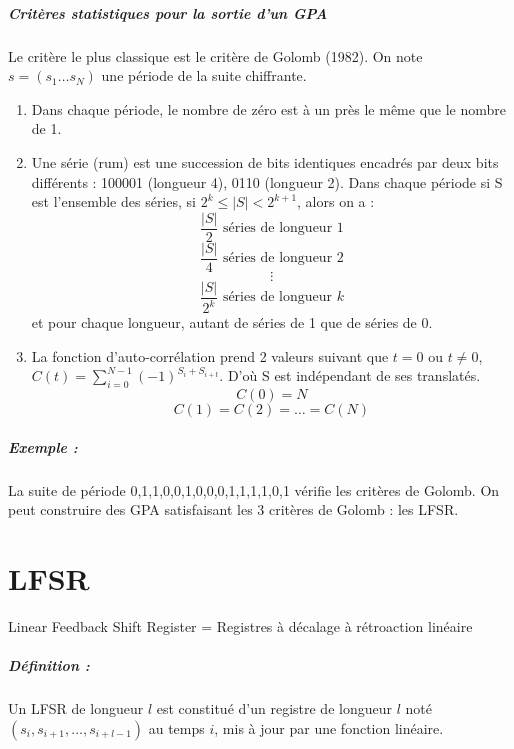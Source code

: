 \documentclass[12pt,a4paper]{report}
\begin{document}
\paragraph{Critères statistiques pour la sortie d'un GPA \\}
Le critère le plus classique est le critère de Golomb (1982). On note $s=(s_1\ldots s_N)$ une période de la suite chiffrante.
\begin{enumerate}
\item Dans chaque période, le nombre de zéro est à un près le même que le nombre de 1.
\item Une série (rum) est une succession de bits identiques encadrés par deux bits différents : 100001 (longueur 4), 0110 (longueur 2). Dans chaque période si S est l'ensemble des séries, si $2^k \leqslant |S| <2^{k+1} $, alors on a :
$$ \frac{|S|}{2} \mbox{ séries de longueur }1 $$
$$ \frac{|S|}{4} \mbox{ séries de longueur }2 $$
$$ \vdots $$
$$ \frac{|S|}{2^k} \mbox{ séries de longueur }k $$
et pour chaque longueur, autant de séries de 1 que de séries de 0.
\item La fonction d'auto-corrélation prend 2 valeurs suivant que $t=0$ ou $t \neq 0$, $C(t) = \displaystyle\sum_{i=0}^{N-1} (-1)^{S_i + S_{i+t}}$. D'où S est indépendant de ses translatés. 
$$ C(0) = N $$
$$ C(1) = C(2) = \ldots = C(N)$$
\end{enumerate}
\paragraph{Exemple :\\}
La suite de période 0,1,1,0,0,1,0,0,0,1,1,1,1,0,1 vérifie les critères de Golomb. On peut construire des GPA satisfaisant les 3 critères de Golomb : les LFSR.

\chapter{LFSR}
Linear Feedback Shift Register = Registres à décalage à rétroaction linéaire

\paragraph{Définition :\\}
Un LFSR de longueur $l$ est constitué d'un registre de longueur $l$ noté $(s_i,s_{i+1}, \ldots, s_{i+l-1})$ au temps $i$, mis à jour par une fonction linéaire.

\begin{figure}[h]
	\centering
  \scalebox{0.45}{}	
\end{figure}
\end{document}
